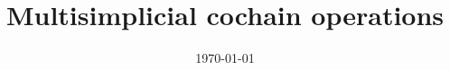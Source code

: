 \documentclass{amsart}
\title[Short title]{Multisimplicial cochain operations}
\date{\today}
\begin{document}
	
	\maketitle
	
	
	
	
	
	\sloppy
	\printbibliography
	\todos
%	
\end{document}
